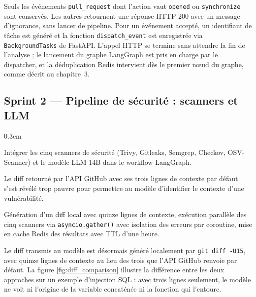         Seuls les événements \texttt{pull\_\allowbreak{}request} dont l'action vaut
        \texttt{opened} ou \texttt{synchronize} sont conservés. Les autres
        retournent une réponse HTTP 200 avec un message d'ignorance, sans
        lancer de pipeline. Pour un événement accepté, un identifiant de
        tâche est généré et la fonction \texttt{dispatch\_\allowbreak{}event} est
        enregistrée via \texttt{BackgroundTasks} de FastAPI. L'appel HTTP se
        termine sans attendre la fin de l'analyse ; le lancement du graphe
        LangGraph est pris en charge par le dispatcher, et la déduplication
        Redis intervient dès le premier nœud du graphe, comme décrit au
        chapitre~3.

    \subsection{Sprint 2 — Pipeline de sécurité : scanners et LLM}

        \begin{description}
            \itemsep 0.3em
            \item[Objectif du sprint :] Intégrer les cinq scanners de sécurité
                (Trivy, Gitleaks, Semgrep, Checkov, OSV-Scanner) et le modèle LLM 14B
                dans le workflow LangGraph.
            \item[Obstacles rencontrés :] Le diff retourné par l'API GitHub avec ses
                trois lignes de contexte par défaut s'est révélé trop pauvre pour
                permettre au modèle d'identifier le contexte d'une vulnérabilité.
            \item[Livrable :] Génération d'un diff local avec quinze lignes de
                contexte, exécution parallèle des cinq scanners via
                \texttt{asyncio.\allowbreak{}gather()} avec isolation des erreurs par coroutine,
                mise en cache Redis des résultats avec TTL d'une heure.
        \end{description}

        Le diff transmis au modèle est désormais généré localement par
        \texttt{git diff -U15}, avec quinze lignes de contexte au lieu des trois que
        l'API GitHub renvoie par défaut. La figure \ref{fig:diff_comparison} illustre
        la différence entre les deux approches sur un exemple d'injection SQL : avec
        trois lignes seulement, le modèle ne voit ni l'origine de la variable
        concaténée ni la fonction qui l'entoure.

